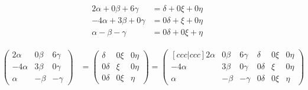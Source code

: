 \documentclass[letterpaper]{article}
\renewcommand{\*}{\cdot}
\theoremstyle{definition}
\begin{document}
	\begin{align*}
		2\alpha + 0\beta + 6\gamma &= \delta + 0\xi + 0\eta\\
		-4\alpha + 3\beta + 0\gamma &= 0\delta + \xi + 0\eta\\
		\alpha - \beta - \gamma &=  0\delta + 0\xi + \eta
	\end{align*}

		\begin{align*}
		\begin{pmatrix}
			2\alpha & 0\beta & 6\gamma\\
			-4\alpha & 3\beta & 0\gamma\\
			\alpha & -\beta & -\gamma
		\end{pmatrix} &=
		\begin{pmatrix}
			\delta & 0\xi & 0\eta\\
			0\delta & \xi & 0\eta\\
			0\delta & 0\xi & \eta
		\end{pmatrix} =
		\begin{pmatrix}[ccc|ccc]
			2\alpha & 0\beta & 6\gamma & \delta & 0\xi & 0\eta\\
			-4\alpha & 3\beta & 0\gamma & 0\delta & \xi & 0\eta\\
			\alpha & -\beta & -\gamma & 0\delta & 0\xi & \eta
		\end{pmatrix}
		\end{align*}
		
\end{document}
